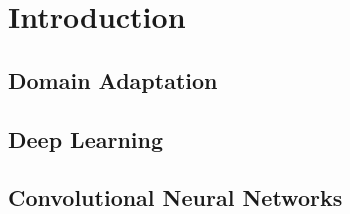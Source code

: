 \documentclass[../main.tex]{subfiles}
\begin{document}
    \section{Introduction}
    \subsection{Domain Adaptation}
    \subsection{Deep Learning}
    \subsection{Convolutional Neural Networks}
\end{document}
